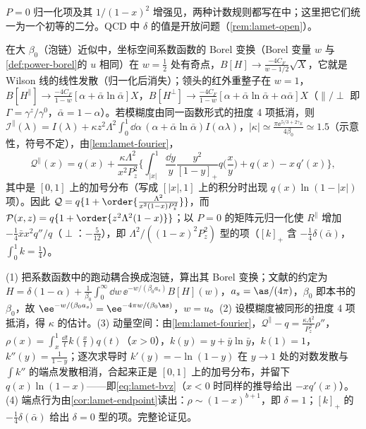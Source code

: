 $P=0$ 归一化项及其 $1/(1-x)^2$ 增强见\cite{Braun:2018brg}，两种计数规则都写在\cite{JiEtAl2021}中；这里把它们统一为一个初等的二分。QCD 中 $\delta$ 的值是开放问题（\cref{rem:lamet-open}）。

\begin{proposition}\label{prop:lamet-bvz}
在大 $\beta_0$（泡链）近似中，坐标空间系数函数的 Borel 变换（Borel 变量 $w$ 与\cref{def:power-borel}的 $u$ 相同）在 $w=\frac12$ 处有奇点，$B[H]\to\frac{-4C_F}{w-1/2}\sqrt X$，它就是 Wilson 线的线性发散（归一化后消失）；领头的红外重整子在 $w=1$，$B[H^\parallel]\to\frac{-4C_F}{1-w}[\alpha+\bar\alpha\ln\bar\alpha]X$，$B[H^\perp]\to\frac{-4C_F}{1-w}[\alpha+\bar\alpha\ln\bar\alpha+\alpha\bar\alpha]X$（$\parallel/\perp$ 即 $\Gamma=\gamma^z/\gamma^0$，$\bar\alpha=1-\alpha$）。若模糊度由同一函数形式的扭度 4 项抵消，则 $\mathcal I^\parallel(\lambda)=I(\lambda)+\kappa z^2\Lambda^2\int_0^1\dd\alpha\,(\alpha+\bar\alpha\ln\bar\alpha)I(\alpha\lambda)$，$|\kappa|\simeq\frac{\pi\ee^{5/3+2\gamma_E}}{4\beta_0}\simeq1.5$（示意性，符号不定），由\cref{lem:lamet-fourier}，
\begin{equation}\label{eq:lamet-bvz}
\mathcal Q^\parallel(x)=q(x)+\frac{\kappa\Lambda^2}{x^2P_z^2}\Big\{\int_{|x|}^1\frac{\dd y}y\frac{y^2}{[1-y]_+}q\Big(\frac xy\Big)+q(x)-x\,q'(x)\Big\},
\end{equation}%
其中是 $[0,1]$ 上的加号分布（写成 $[|x|,1]$ 上的积分时出现 $q(x)\ln(1-|x|)$ 项）。因此 $\mathcal Q=q\{1+\order{\frac{\Lambda^2}{x^2(1-x)P_z^2}}\}$，而 $\mathcal P(x,z)=q\{1+\order{z^2\Lambda^2(1-x)}\}$；以 $P=0$ 的矩阵元归一化使 $R^\parallel$ 增加 $-\frac14\bar xx^2q''/q$（$\perp$：$-\frac5{12}$），即 $\Lambda^2/((1-x)^2P_z^2)$ 型的项（$[k]_+$ 含 $-\frac14\delta(\bar\alpha)$，$\int_0^1k=\frac14$）。
\end{proposition}

\begin{proofsketch}
(1) 把系数函数中的跑动耦合换成泡链，算出其 Borel 变换\cite{Braun:2018brg}；文献的约定为 $H=\delta(1-\alpha)+\frac1{\beta_0}\int_0^\infty\dd w\,\ee^{-w/(\beta_0a_s)}B[H](w)$，$a_s=\as/(4\pi)$，$\beta_0$ 即本书的 $\beta_0$，故 $\ee^{-w/(\beta_0a_s)}=\ee^{-4\pi w/(\beta_0\as)}$，$w=u$。(2) 设模糊度被同形的扭度 4 项抵消，得 $\kappa$ 的估计。(3) 动量空间：由\cref{lem:lamet-fourier}，$\mathcal Q^\parallel-q=\frac{\kappa\Lambda^2}{P_z^2}\rho''$，$\rho(x)=\int_x^1\frac{\dd t}tk(\frac xt)q(t)$（$x>0$），$k(y)=y+\bar y\ln\bar y$，$k(1)=1$，$k''(y)=\frac1{1-y}$；逐次求导时 $k'(y)=-\ln(1-y)$ 在 $y\to1$ 处的对数发散与 $\int k''$ 的端点发散相消，合起来正是 $[0,1]$ 上的加号分布，并留下 $q(x)\ln(1-x)$——即\cref{eq:lamet-bvz}（$x<0$ 时同样的推导给出 $-xq'(x)$）。(4) 端点行为由\cref{cor:lamet-endpoint}读出：$\rho\sim(1-x)^{b+1}$，即 $\delta=1$；$[k]_+$ 的 $-\frac14\delta(\bar\alpha)$ 给出 $\delta=0$ 型的项。完整论证见\cite{Braun:2018brg}。
\end{proofsketch}

